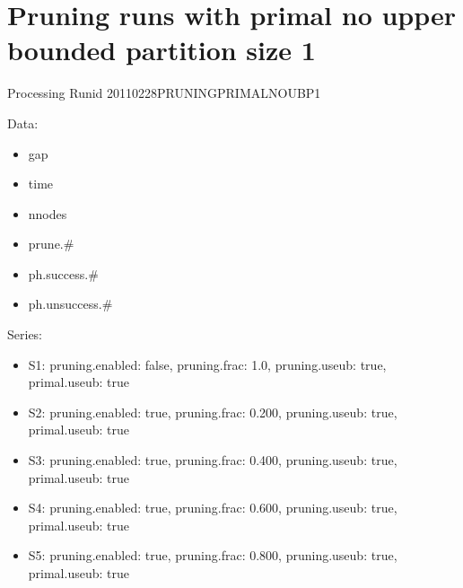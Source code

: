 \documentclass[landscape, 12pt]{report}
\begin{document}
\section{Pruning runs with primal no upper bounded partition size 1}

Processing Runid 20110228PRUNINGPRIMALNOUBP1

Data:
\begin{itemize}
\item gap
\item time
\item nnodes
\item prune.\#
\item ph.success.\#
\item ph.unsuccess.\#
\end{itemize}
Series:
\begin{itemize}
\item S1: pruning.enabled: false, pruning.frac: 1.0, pruning.useub: true, primal.useub: true
\item S2: pruning.enabled: true, pruning.frac: 0.200, pruning.useub: true, primal.useub: true
\item S3: pruning.enabled: true, pruning.frac: 0.400, pruning.useub: true, primal.useub: true
\item S4: pruning.enabled: true, pruning.frac: 0.600, pruning.useub: true, primal.useub: true
\item S5: pruning.enabled: true, pruning.frac: 0.800, pruning.useub: true, primal.useub: true
\end{itemize}
\end{document}
